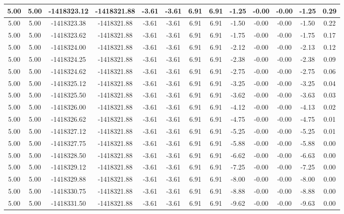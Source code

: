 \begin{table}[htbp]
\begin{adjustbox}{angle=90}
\begin{tabular}{|c|c|c|c|c|c|c|c|c|c|c|c|c|}
 5.00 & 5.00 & -1418323.12 & -1418321.88 & -3.61 & -3.61 & 6.91 & 6.91 & -1.25 & -0.00 & -0.00 & -1.25 & 0.29\\ \hline
 5.00 & 5.00 & -1418323.38 & -1418321.88 & -3.61 & -3.61 & 6.91 & 6.91 & -1.50 & -0.00 & -0.00 & -1.50 & 0.22\\ \hline
 5.00 & 5.00 & -1418323.62 & -1418321.88 & -3.61 & -3.61 & 6.91 & 6.91 & -1.75 & -0.00 & -0.00 & -1.75 & 0.17\\ \hline
 5.00 & 5.00 & -1418324.00 & -1418321.88 & -3.61 & -3.61 & 6.91 & 6.91 & -2.12 & -0.00 & -0.00 & -2.13 & 0.12\\ \hline
 5.00 & 5.00 & -1418324.25 & -1418321.88 & -3.61 & -3.61 & 6.91 & 6.91 & -2.38 & -0.00 & -0.00 & -2.38 & 0.09\\ \hline
 5.00 & 5.00 & -1418324.62 & -1418321.88 & -3.61 & -3.61 & 6.91 & 6.91 & -2.75 & -0.00 & -0.00 & -2.75 & 0.06\\ \hline
 5.00 & 5.00 & -1418325.12 & -1418321.88 & -3.61 & -3.61 & 6.91 & 6.91 & -3.25 & -0.00 & -0.00 & -3.25 & 0.04\\ \hline
 5.00 & 5.00 & -1418325.50 & -1418321.88 & -3.61 & -3.61 & 6.91 & 6.91 & -3.62 & -0.00 & -0.00 & -3.63 & 0.03\\ \hline
 5.00 & 5.00 & -1418326.00 & -1418321.88 & -3.61 & -3.61 & 6.91 & 6.91 & -4.12 & -0.00 & -0.00 & -4.13 & 0.02\\ \hline
 5.00 & 5.00 & -1418326.62 & -1418321.88 & -3.61 & -3.61 & 6.91 & 6.91 & -4.75 & -0.00 & -0.00 & -4.75 & 0.01\\ \hline
 5.00 & 5.00 & -1418327.12 & -1418321.88 & -3.61 & -3.61 & 6.91 & 6.91 & -5.25 & -0.00 & -0.00 & -5.25 & 0.01\\ \hline
 5.00 & 5.00 & -1418327.75 & -1418321.88 & -3.61 & -3.61 & 6.91 & 6.91 & -5.88 & -0.00 & -0.00 & -5.88 & 0.00\\ \hline
 5.00 & 5.00 & -1418328.50 & -1418321.88 & -3.61 & -3.61 & 6.91 & 6.91 & -6.62 & -0.00 & -0.00 & -6.63 & 0.00\\ \hline
 5.00 & 5.00 & -1418329.12 & -1418321.88 & -3.61 & -3.61 & 6.91 & 6.91 & -7.25 & -0.00 & -0.00 & -7.25 & 0.00\\ \hline
 5.00 & 5.00 & -1418329.88 & -1418321.88 & -3.61 & -3.61 & 6.91 & 6.91 & -8.00 & -0.00 & -0.00 & -8.00 & 0.00\\ \hline
 5.00 & 5.00 & -1418330.75 & -1418321.88 & -3.61 & -3.61 & 6.91 & 6.91 & -8.88 & -0.00 & -0.00 & -8.88 & 0.00\\ \hline
 5.00 & 5.00 & -1418331.50 & -1418321.88 & -3.61 & -3.61 & 6.91 & 6.91 & -9.62 & -0.00 & -0.00 & -9.63 & 0.00\\ \hline

\end{tabular}
\end{adjustbox}
\end{table}
